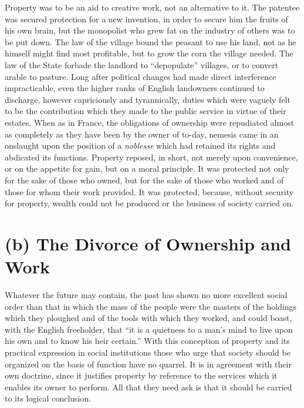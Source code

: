 \documentclass{book}
\begin{document}
Property was to be an aid to creative work, not an alternative to it. The patentee was secured protection for a new invention, in order to secure him the fruits of his own brain, but the monopolist who grew fat on the industry of others was to be put down. The law of the village bound the peasant to use his land, not as he himself might find most profitable, but to grow the corn the village needed. The law of the State forbade the landlord to “depopulate” villages, or to convert arable to pasture. Long after political changes had made direct interference impracticable, even the higher ranks of English landowners continued to discharge, however capriciously and tyrannically, duties which were vaguely felt to be the contribution which they made to the public service in virtue of their estates. When as in France, the obligations of ownership were repudiated almost as completely as they have been by the owner of to-day, nemesis came in an onslaught upon the position of a \emph{noblesse} which had retained its rights and abdicated its functions. Property reposed, in short, not merely upon convenience, or on the appetite for gain, but on a moral principle. It was protected not only for the sake of those who owned, but for the sake of those who worked and of those for whom their work provided. It was protected, because, without security for property, wealth could not be produced or the business of society carried on.

\section{(b) The Divorce of Ownership and Work}
Whatever the future may contain, the past has shown no more excellent social order than that in which the mass of the people were the masters of the holdings which they ploughed and of the tools with which they worked, and could boast, with the English freeholder, that “it is a quietness to a man’s mind to live upon his own and to know his heir certain.” With this conception of property and its practical expression in social institutions those who urge that society should be organized on the basis of function have no quarrel. It is in agreement with their own doctrine, since it justifies property by reference to the services which it enables its owner to perform. All that they need ask is that it should be carried to its logical conclusion.
\end{document}
